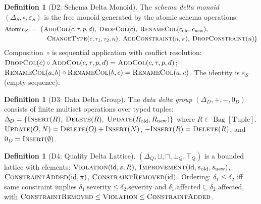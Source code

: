 \documentclass[11pt,a4paper]{article}
\theoremstyle{definition}
\newtheorem{definition}[theorem]{Definition}
\newcommand{\DeltaS}{\Delta_{\!S}}
\newcommand{\DeltaD}{\Delta_{\!D}}
\newcommand{\DeltaQ}{\Delta_{\!Q}}
\newcommand{\epsS}{\varepsilon_S}
\newcommand{\zeroD}{0_D}
\newcommand{\botQ}{\bot_Q}
\newcommand{\topQ}{\top_Q}
\DeclareMathOperator{\Bag}{Bag}
\begin{document}
\begin{definition}[D2: Schema Delta Monoid]\label{def:schema-delta}
The \emph{schema delta monoid} $(\DeltaS, \circ, \epsS)$ is the free monoid
generated by the atomic schema operations:
\begin{align*}
\mathrm{Atomic}_S \;=\; \{&\textsc{AddCol}(c, \tau, p, d),\;
  \textsc{DropCol}(c),\;
  \textsc{RenameCol}(c_{\mathrm{old}}, c_{\mathrm{new}}),\\
  &\;\;\textsc{ChangeType}(c, \tau_1, \tau_2, \kappa),\;
  \textsc{AddConstraint}(n, \pi),\;
  \textsc{DropConstraint}(n)\}
\end{align*}
Composition~$\circ$ is sequential application with conflict resolution:
$\textsc{DropCol}(c) \circ \textsc{AddCol}(c, \tau, p, d) = \textsc{AddCol}(c, \tau, p, d)$;
$\textsc{RenameCol}(a, b) \circ \textsc{RenameCol}(b, c) = \textsc{RenameCol}(a, c)$.
The identity is $\epsS$ (empty sequence).
\end{definition}

\begin{definition}[D3: Data Delta Group]\label{def:data-delta}
The \emph{data delta group} $(\DeltaD, +, -, \zeroD)$ consists of finite
multiset operations over typed tuples:
$\DeltaD = \{\textsc{Insert}(R),\; \textsc{Delete}(R),\;
\textsc{Update}(R_{\mathrm{old}}, R_{\mathrm{new}})\}$
where $R \in \Bag[\mathrm{Tuple}]$.
$\textsc{Update}(O, N) = \textsc{Delete}(O) + \textsc{Insert}(N)$,
$-\textsc{Insert}(R) = \textsc{Delete}(R)$, and $\zeroD = \textsc{Insert}(\emptyset)$.
\end{definition}

\begin{definition}[D4: Quality Delta Lattice]\label{def:quality-delta}
$(\DeltaQ, \sqcup, \sqcap, \botQ, \topQ)$ is a bounded lattice with elements:
$\textsc{Violation}(\mathrm{id}, s, R)$,
$\textsc{Improvement}(\mathrm{id}, s_{\mathrm{old}}, s_{\mathrm{new}})$,
$\textsc{ConstraintAdded}(\mathrm{id}, \pi)$,
$\textsc{ConstraintRemoved}(\mathrm{id})$.
Ordering: $\delta_1 \leq \delta_2$ iff same constraint implies
$\delta_1.\mathrm{severity} \leq \delta_2.\mathrm{severity}$ and
$\delta_1.\mathrm{affected} \subseteq \delta_2.\mathrm{affected}$,
with $\textsc{ConstraintRemoved} \leq \textsc{Violation} \leq \textsc{ConstraintAdded}$.
\end{definition}
\end{document}

